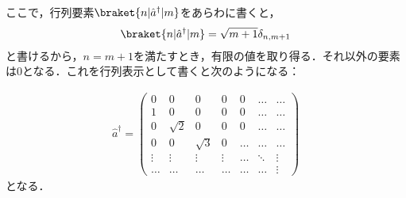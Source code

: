 ここで，行列要素$\braket{n|\hat{a}^{\dagger}|m}$をあらわに書くと，
\begin{align}
    \braket{n|\hat{a}^{\dagger}|m}
    =\sqrt{m+1}\delta_{n,m+1}
\end{align}
と書けるから，$n=m+1$を満たすとき，有限の値を取り得る．それ以外の要素は0となる．これを行列表示として書くと次のようになる：

\begin{align}
    \hat{a}^{\dagger}=
    \left(
    \begin{array}{ccccccc}
   0& 0& 0&0&0& \dots  & \dots\\
  1 &0& 0&0&0& \dots  & \dots\\
  0&\sqrt{2}& 0&0&0& \dots  & \dots\\
  0&0&\sqrt{3}&0& \dots& \dots  & \dots\\
  \vdots & \vdots &\vdots & \vdots & \dots& \ddots & \vdots \\
  \dots & \dots&\dots & \dots& \dots& \dots  & \vdots
    \end{array}
    \right)
\end{align}
となる．


